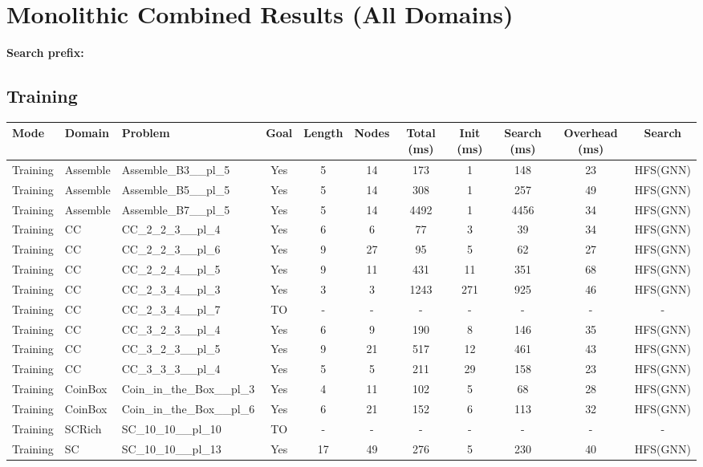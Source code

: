 \documentclass{article}
\begin{document}
\section*{Monolithic Combined Results (All Domains)}
\textbf{Search prefix:} 
\\[0.5cm]
\subsection*{Training}
\begin{tabular}{lllcccccccc}
\toprule
Mode & Domain & Problem & Goal & Length & Nodes & Total (ms) & Init (ms) & Search (ms) & Overhead (ms) & Search \\
\midrule
Training & Assemble & Assemble\_B3\_\_pl\_5 & Yes & 5 & 14 & 173 & 1 & 148 & 23 & HFS(GNN) \\
Training & Assemble & Assemble\_B5\_\_pl\_5 & Yes & 5 & 14 & 308 & 1 & 257 & 49 & HFS(GNN) \\
Training & Assemble & Assemble\_B7\_\_pl\_5 & Yes & 5 & 14 & 4492 & 1 & 4456 & 34 & HFS(GNN) \\
Training & CC & CC\_2\_2\_3\_\_pl\_4 & Yes & 6 & 6 & 77 & 3 & 39 & 34 & HFS(GNN) \\
Training & CC & CC\_2\_2\_3\_\_pl\_6 & Yes & 9 & 27 & 95 & 5 & 62 & 27 & HFS(GNN) \\
Training & CC & CC\_2\_2\_4\_\_pl\_5 & Yes & 9 & 11 & 431 & 11 & 351 & 68 & HFS(GNN) \\
Training & CC & CC\_2\_3\_4\_\_pl\_3 & Yes & 3 & 3 & 1243 & 271 & 925 & 46 & HFS(GNN) \\
Training & CC & CC\_2\_3\_4\_\_pl\_7 & TO & - & - & - & - & - & - & - \\
Training & CC & CC\_3\_2\_3\_\_pl\_4 & Yes & 6 & 9 & 190 & 8 & 146 & 35 & HFS(GNN) \\
Training & CC & CC\_3\_2\_3\_\_pl\_5 & Yes & 9 & 21 & 517 & 12 & 461 & 43 & HFS(GNN) \\
Training & CC & CC\_3\_3\_3\_\_pl\_4 & Yes & 5 & 5 & 211 & 29 & 158 & 23 & HFS(GNN) \\
Training & CoinBox & Coin\_in\_the\_Box\_\_pl\_3 & Yes & 4 & 11 & 102 & 5 & 68 & 28 & HFS(GNN) \\
Training & CoinBox & Coin\_in\_the\_Box\_\_pl\_6 & Yes & 6 & 21 & 152 & 6 & 113 & 32 & HFS(GNN) \\
Training & SCRich & SC\_10\_10\_\_pl\_10 & TO & - & - & - & - & - & - & - \\
Training & SC & SC\_10\_10\_\_pl\_13 & Yes & 17 & 49 & 276 & 5 & 230 & 40 & HFS(GNN) \\

\end{tabular}
\end{document}
